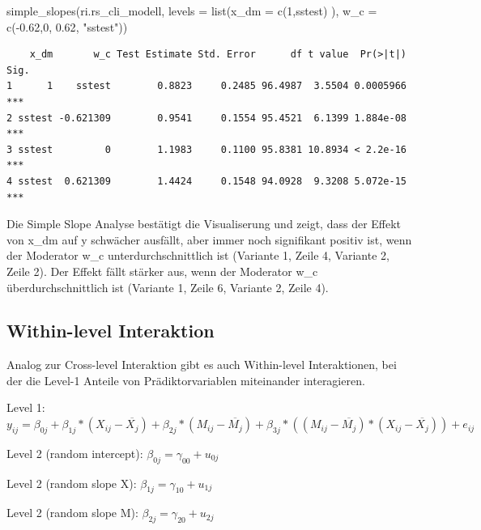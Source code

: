 \documentclass[
  letterpaper,
  DIV=11,
  numbers=noendperiod]{scrreprt}
\newenvironment{Shaded}{\begin{snugshade}}{\end{snugshade}}
\newcommand{\AttributeTok}[1]{\textcolor[rgb]{0.40,0.45,0.13}{#1}}
\newcommand{\DecValTok}[1]{\textcolor[rgb]{0.68,0.00,0.00}{#1}}
\newcommand{\FloatTok}[1]{\textcolor[rgb]{0.68,0.00,0.00}{#1}}
\newcommand{\FunctionTok}[1]{\textcolor[rgb]{0.28,0.35,0.67}{#1}}
\newcommand{\NormalTok}[1]{\textcolor[rgb]{0.00,0.23,0.31}{#1}}
\newcommand{\SpecialCharTok}[1]{\textcolor[rgb]{0.37,0.37,0.37}{#1}}
\newcommand{\StringTok}[1]{\textcolor[rgb]{0.13,0.47,0.30}{#1}}
\begin{document}
\begin{Shaded}
\begin{Highlighting}[]
\FunctionTok{simple\_slopes}\NormalTok{(ri.rs\_cli\_modell,}
              \AttributeTok{levels =} \FunctionTok{list}\NormalTok{(}\AttributeTok{x\_dm =} \FunctionTok{c}\NormalTok{(}\DecValTok{1}\NormalTok{,}\StringTok{\textquotesingle{}sstest\textquotesingle{}}\NormalTok{) ),}
              \AttributeTok{w\_c =} \FunctionTok{c}\NormalTok{(}\SpecialCharTok{{-}}\FloatTok{0.62}\NormalTok{,}\DecValTok{0}\NormalTok{, }\FloatTok{0.62}\NormalTok{, }\StringTok{"sstest"}\NormalTok{))}
\end{Highlighting}
\end{Shaded}

\begin{verbatim}
    x_dm       w_c Test Estimate Std. Error      df t value  Pr(>|t|) Sig.
1      1    sstest        0.8823     0.2485 96.4987  3.5504 0.0005966  ***
2 sstest -0.621309        0.9541     0.1554 95.4521  6.1399 1.884e-08  ***
3 sstest         0        1.1983     0.1100 95.8381 10.8934 < 2.2e-16  ***
4 sstest  0.621309        1.4424     0.1548 94.0928  9.3208 5.072e-15  ***
\end{verbatim}

Die Simple Slope Analyse bestätigt die Visualiserung und zeigt, dass der
Effekt von x\_dm auf y schwächer ausfällt, aber immer noch signifikant
positiv ist, wenn der Moderator w\_c unterdurchschnittlich ist (Variante
1, Zeile 4, Variante 2, Zeile 2). Der Effekt fällt stärker aus, wenn der
Moderator w\_c überdurchschnittlich ist (Variante 1, Zeile 6, Variante
2, Zeile 4).

\subsection{Within-level Interaktion}\label{within-level-interaktion}

Analog zur Cross-level Interaktion gibt es auch Within-level
Interaktionen, bei der die Level-1 Anteile von Prädiktorvariablen
miteinander interagieren.

Level 1:
\(y_{ij} = \beta_{0j} + \beta_{1j}*(X_{ij}-\overline{X_j}) + \beta_{2j}*(M_{ij}-\overline{M_j}) + \beta_{3j}*((M_{ij}-\overline{M_j})*(X_{ij}-\overline{X_j})) + e_{ij}\)

Level 2 (random intercept): \(\beta_{0j} = \gamma_{00} + u_{0j}\)

Level 2 (random slope X): \(\beta_{1j} = \gamma_{10} + u_{1j}\)

Level 2 (random slope M): \(\beta_{2j} = \gamma_{20} + u_{2j}\)
\end{document}
